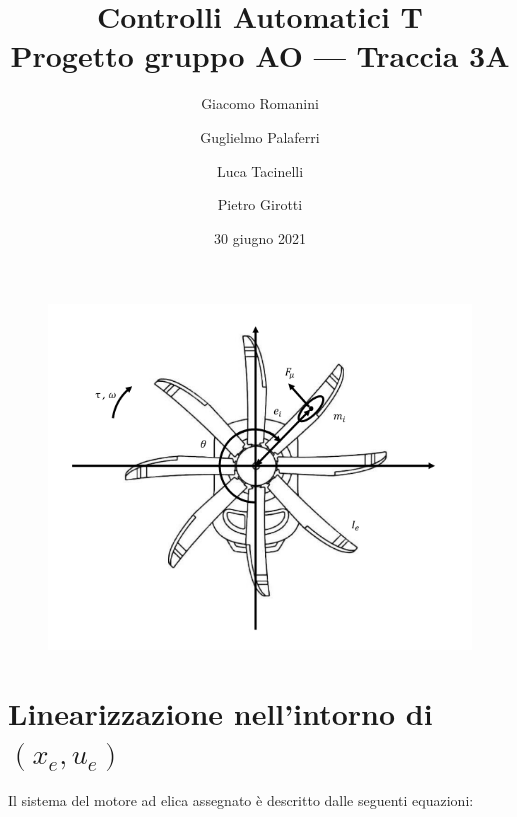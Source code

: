 \documentclass[a4paper,12pt,italian]{article}
\title{
    Controlli Automatici T \\
    \large Progetto gruppo AO --- Traccia 3A\\
}
\author{
    Giacomo Romanini\\
    \and
    Guglielmo Palaferri\\
    \and
    Luca Tacinelli\\
    \and
    Pietro Girotti\\
}
\date{30 giugno 2021}
\begin{document}
\maketitle

\begin{figure}[h]
    \begin{center}
        \includegraphics[scale=0.5]{img/elica.png}
    \end{center}    
\end{figure}


\section{Linearizzazione nell'intorno di $(x_e, u_e)$}
Il sistema del motore ad elica assegnato è descritto dalle seguenti equazioni: 
\end{document}
